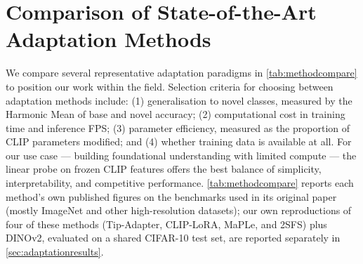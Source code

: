 \documentclass{iutbscthesis}
\begin{document}
\section{Comparison of State-of-the-Art Adaptation Methods}

We compare several representative adaptation paradigms in \autoref{tab:methodcompare} to position our work within the field. Selection criteria for choosing between adaptation methods include: (1) generalisation to novel classes, measured by the Harmonic Mean of base and novel accuracy; (2) computational cost in training time and inference FPS; (3) parameter efficiency, measured as the proportion of CLIP parameters modified; and (4) whether training data is available at all. For our use case --- building foundational understanding with limited compute --- the linear probe on frozen CLIP features offers the best balance of simplicity, interpretability, and competitive performance. \autoref{tab:methodcompare} reports each method's own published figures on the benchmarks used in its original paper (mostly ImageNet and other high-resolution datasets); our own reproductions of four of these methods (Tip-Adapter, CLIP-LoRA, MaPLe, and 2SFS) plus DINOv2, evaluated on a shared CIFAR-10 test set, are reported separately in \autoref{sec:adaptationresults}.

\begin{table}[H]
    \centering
    \caption{Comparison of few-shot CLIP adaptation methods}
    \label{tab:methodcompare}
\end{table}
\end{document}
